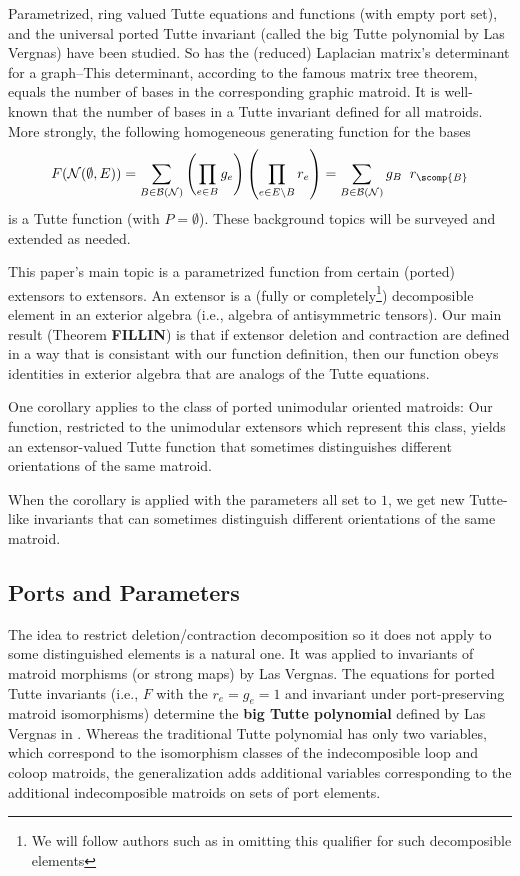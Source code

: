 Parametrized, ring valued
Tutte equations and functions (with empty port set), and 
the universal ported Tutte invariant (called the big Tutte 
polynomial by Las Vergnas) have been studied.  So has
the (reduced) Laplacian matrix's determinant for a graph--This 
determinant, according to the famous matrix tree theorem, equals
the number of bases in the corresponding graphic matroid.  It is
well-known that the number of bases in a Tutte invariant defined
for all matroids.  More strongly, the following homogeneous generating
function for the bases
\[
F(\mathcal{N}(\emptyset,E))=
\sum_{B\in\mathcal{B}(\mathcal{N})}
\left(\prod_{e\in B} g_e
\right)
\left(\prod_{e\in E\setminus B} r_e
\right)
=
\sum_{B\in\mathcal{B}(\mathcal{N})}
g_B\;\;r_{\scomp{B}}
\]
is a Tutte function (with $P=\emptyset$).
These background topics will be surveyed and extended as needed.


This paper's main topic is a parametrized function from certain
(ported) extensors to extensors.  An extensor is a 
(fully or completely\footnote{We will follow authors such as
\cite{JacobsonI} in omitting this qualifier for such decomposible elements})
decomposible element in an exterior algebra (i.e., algebra of antisymmetric
tensors).  Our main result (Theorem \textbf{FILLIN}) is that 
if extensor deletion and contraction are defined in a way that is
consistant with our function definition, then our function obeys 
identities in exterior algebra that are analogs of the Tutte 
equations.  


One corollary applies to the class of ported unimodular oriented
matroids:  Our function, restricted to the unimodular extensors
which represent this class, yields an extensor-valued Tutte function 
that sometimes distinguishes different orientations of the same 
matroid.

When the corollary is applied with the
parameters all set to $1$, we get new Tutte-like invariants
that can sometimes distinguish different orientations of the same matroid.

\subsection{Ports and Parameters}

The idea to restrict deletion/contraction decomposition so it does
not apply to some distinguished elements 
is a natural one.  It was applied to invariants of
matroid morphisms (or strong maps) by Las 
Vergnas\cite{MR0419272,SetPointedLV,EtienneLasVergnasMorphismVectorial}.
The equations for 
ported Tutte invariants (i.e., $F$ with the $r_e=g_e=1$ and 
invariant under port-preserving matroid isomorphisms) determine
the 
\textbf{big Tutte polynomial} defined by Las Vergnas in \cite{SetPointedLV}.
Whereas the traditional Tutte polynomial has only two variables,
which correspond to the isomorphism classes of the indecomposible 
loop and coloop matroids, the generalization adds additional
variables corresponding to the additional indecomposible matroids
on sets of port elements. 


